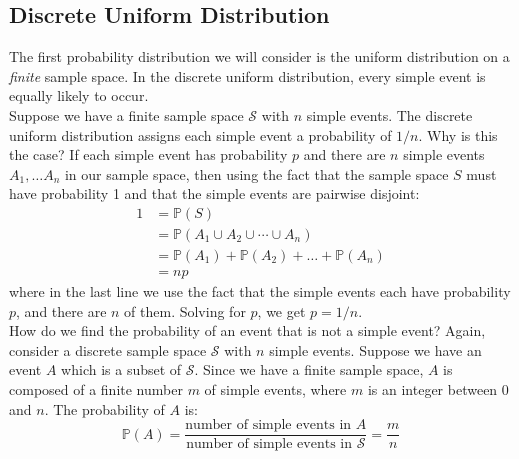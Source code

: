 \documentclass[12pt]{article}
\theoremstyle{definition}
\theoremstyle{remark}
\def\P{{\mathbb P}}
\def\cals{{\mathcal S}}
\begin{document}

\subsection{Discrete Uniform Distribution}
The first probability distribution we will consider is the uniform distribution on a \emph{finite} sample space. In the discrete uniform distribution, every simple event is equally likely to occur. \\

Suppose we have a finite sample space $\cals$ with $n$ simple events. The discrete uniform distribution assigns each simple event a probability of $1/n$. Why is this the case? If each simple event has probability $p$ and there are $n$ simple events $A_1, \dots A_n$ in our sample space, then using the fact that the sample space $S$ must have probability 1 and that the simple events are pairwise disjoint:
\begin{align*}
1 &= \P(S) \\
&= \P(A_1 \cup A_2 \cup \cdots \cup A_n) \\
&= \P(A_1) + \P(A_2) + \dots + \P(A_n) \\
&= np
\end{align*}
where in the last line we use the fact that the simple events each have probability $p$, and there are $n$ of them. Solving for $p$, we get $p = 1/n$.\\

How do we find the probability of an event that is not a simple event? Again, consider a discrete sample space $\cals$ with $n$ simple events. Suppose we have an event $A$ which is a subset of $\cals$. Since we have a finite sample space, $A$ is composed of a finite number $m$ of simple events, where $m$ is an integer between 0 and $n$. The probability of $A$ is:
\[
\P(A) = \frac{ \text{number of simple events in $A$}}{\text{number of simple events in $\cals$}} = \frac{m}{n}
\]
\end{document}
